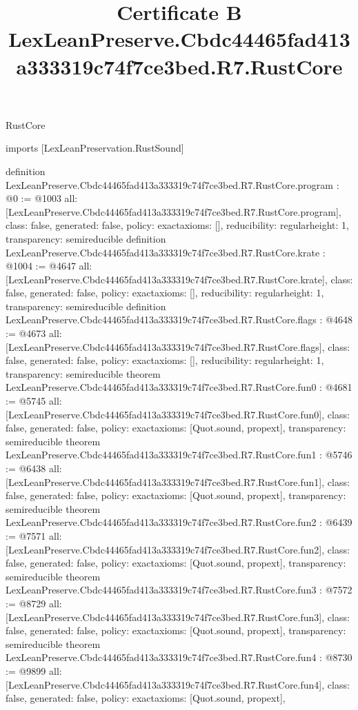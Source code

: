 \begin{lexlean}{RustCore}
\title{Certificate B LexLeanPreserve.Cbdc44465fad413a333319c74f7ce3bed.R7.RustCore}
\begin{coremodule}
imports [LexLeanPreservation.RustSound]

definition LexLeanPreserve.Cbdc44465fad413a333319c74f7ce3bed.R7.RustCore.program : @0 := @1003 {
  all: [LexLeanPreserve.Cbdc44465fad413a333319c74f7ce3bed.R7.RustCore.program],
  class: false,
  generated: false,
  policy: exact{axioms: []},
  reducibility: regular{height: 1},
  transparency: semireducible
}
definition LexLeanPreserve.Cbdc44465fad413a333319c74f7ce3bed.R7.RustCore.krate : @1004 := @4647 {
  all: [LexLeanPreserve.Cbdc44465fad413a333319c74f7ce3bed.R7.RustCore.krate],
  class: false,
  generated: false,
  policy: exact{axioms: []},
  reducibility: regular{height: 1},
  transparency: semireducible
}
definition LexLeanPreserve.Cbdc44465fad413a333319c74f7ce3bed.R7.RustCore.flags : @4648 := @4673 {
  all: [LexLeanPreserve.Cbdc44465fad413a333319c74f7ce3bed.R7.RustCore.flags],
  class: false,
  generated: false,
  policy: exact{axioms: []},
  reducibility: regular{height: 1},
  transparency: semireducible
}
theorem LexLeanPreserve.Cbdc44465fad413a333319c74f7ce3bed.R7.RustCore.fun0 : @4681 := @5745 {
  all: [LexLeanPreserve.Cbdc44465fad413a333319c74f7ce3bed.R7.RustCore.fun0],
  class: false,
  generated: false,
  policy: exact{axioms: [Quot.sound, propext]},
  transparency: semireducible
}
theorem LexLeanPreserve.Cbdc44465fad413a333319c74f7ce3bed.R7.RustCore.fun1 : @5746 := @6438 {
  all: [LexLeanPreserve.Cbdc44465fad413a333319c74f7ce3bed.R7.RustCore.fun1],
  class: false,
  generated: false,
  policy: exact{axioms: [Quot.sound, propext]},
  transparency: semireducible
}
theorem LexLeanPreserve.Cbdc44465fad413a333319c74f7ce3bed.R7.RustCore.fun2 : @6439 := @7571 {
  all: [LexLeanPreserve.Cbdc44465fad413a333319c74f7ce3bed.R7.RustCore.fun2],
  class: false,
  generated: false,
  policy: exact{axioms: [Quot.sound, propext]},
  transparency: semireducible
}
theorem LexLeanPreserve.Cbdc44465fad413a333319c74f7ce3bed.R7.RustCore.fun3 : @7572 := @8729 {
  all: [LexLeanPreserve.Cbdc44465fad413a333319c74f7ce3bed.R7.RustCore.fun3],
  class: false,
  generated: false,
  policy: exact{axioms: [Quot.sound, propext]},
  transparency: semireducible
}
theorem LexLeanPreserve.Cbdc44465fad413a333319c74f7ce3bed.R7.RustCore.fun4 : @8730 := @9899 {
  all: [LexLeanPreserve.Cbdc44465fad413a333319c74f7ce3bed.R7.RustCore.fun4],
  class: false,
  generated: false,
  policy: exact{axioms: [Quot.sound, propext]},
}
\end{coremodule}
\end{lexlean}
